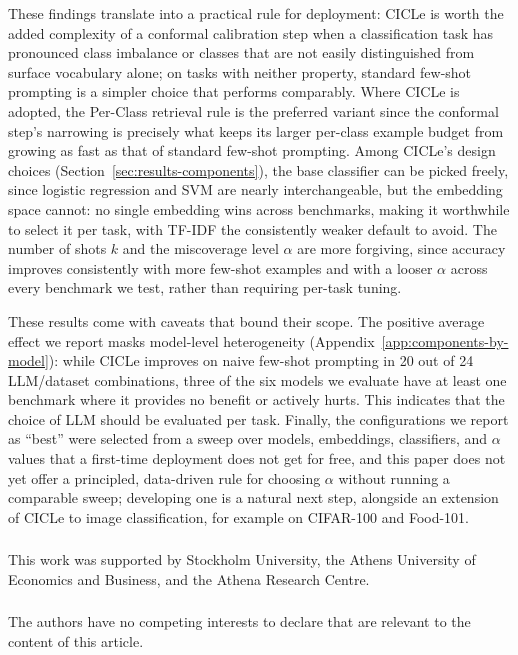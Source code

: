 \documentclass[runningheads]{llncs}
\begin{document}
These findings translate into a practical rule for deployment: CICLe is worth the added complexity of a conformal calibration step when a classification task has pronounced class imbalance or classes
that are not easily distinguished from surface vocabulary alone; on tasks with neither property, standard few-shot prompting is a simpler
choice that performs comparably. Where CICLe is adopted, the Per-Class retrieval rule is the preferred variant since the conformal step's narrowing is precisely what keeps its larger per-class example budget from growing as fast as that of standard few-shot prompting. Among CICLe's design choices (Section~\ref{sec:results-components}), the base classifier can be picked freely, since logistic regression and SVM are
nearly interchangeable, but the embedding space cannot: no single
embedding wins across benchmarks, making it worthwhile to select it per task, with TF-IDF the consistently weaker
default to avoid. The number of shots $k$ and the miscoverage level
$\alpha$ are more forgiving, since accuracy improves consistently with
more few-shot examples and with a looser $\alpha$ across every benchmark we test, rather than requiring per-task tuning.

These results come with caveats that bound their scope. The positive
average effect we report masks model-level heterogeneity
(Appendix~\ref{app:components-by-model}): while CICLe improves on naive
few-shot prompting in 20 out of 24 LLM/dataset combinations, three of
the six models we evaluate have at least one benchmark where it provides
no benefit or actively hurts. This indicates that the choice of LLM
should be evaluated per task. Finally, the configurations we report as
``best'' were selected from a sweep over models, embeddings,
classifiers, and $\alpha$ values that a first-time deployment does not
get for free, and this paper does not yet offer a principled,
data-driven rule for choosing $\alpha$ without running a comparable
sweep; developing one is a natural next step, alongside an extension of CICLe to image classification, for example
on CIFAR-100 and Food-101.
%
%
\begin{credits}
\subsubsection{\ackname}
This work was supported by Stockholm University, the Athens University
of Economics and Business, and the Athena Research Centre.

\subsubsection{\discintname}
The authors have no competing interests to declare that are
relevant to the content of this article.
\end{credits}
\end{document}
